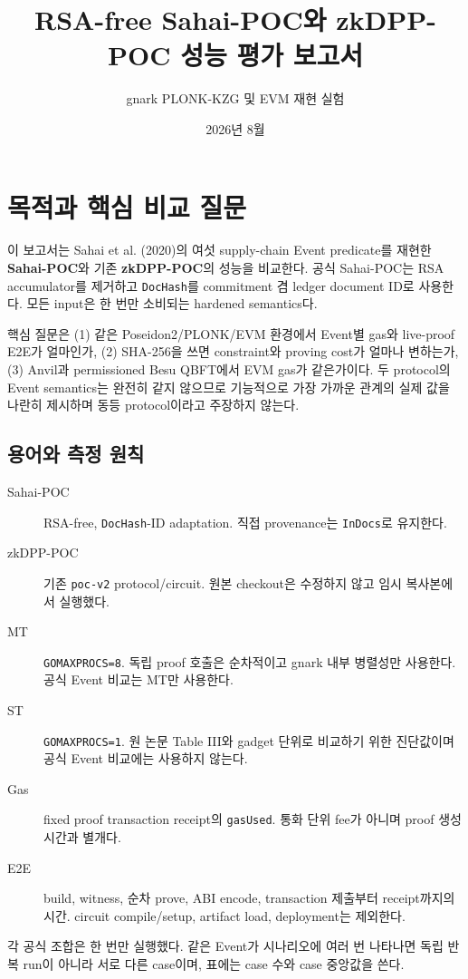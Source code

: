 \documentclass[10pt]{article}
\title{RSA-free Sahai-POC와 zkDPP-POC 성능 평가 보고서}
\author{gnark PLONK-KZG 및 EVM 재현 실험}
\date{2026년 8월}
\begin{document}
\maketitle
\tableofcontents
\newpage
\section{목적과 핵심 비교 질문}
이 보고서는 Sahai et al. (2020)의 여섯 supply-chain Event predicate를 재현한 \textbf{Sahai-POC}와 기존 \textbf{zkDPP-POC}의 성능을 비교한다. 공식 Sahai-POC는 RSA accumulator를 제거하고 \texttt{DocHash}를 commitment 겸 ledger document ID로 사용한다. 모든 input은 한 번만 소비되는 hardened semantics다.

핵심 질문은 (1) 같은 Poseidon2/PLONK/EVM 환경에서 Event별 gas와 live-proof E2E가 얼마인가, (2) SHA-256을 쓰면 constraint와 proving cost가 얼마나 변하는가, (3) Anvil과 permissioned Besu QBFT에서 EVM gas가 같은가이다. 두 protocol의 Event semantics는 완전히 같지 않으므로 기능적으로 가장 가까운 관계의 실제 값을 나란히 제시하며 동등 protocol이라고 주장하지 않는다.

\subsection{용어와 측정 원칙}
\begin{description}
\item[Sahai-POC] RSA-free, \texttt{DocHash}-ID adaptation. 직접 provenance는 \texttt{InDocs}로 유지한다.
\item[zkDPP-POC] 기존 \texttt{poc-v2} protocol/circuit. 원본 checkout은 수정하지 않고 임시 복사본에서 실행했다.
\item[MT] \texttt{GOMAXPROCS=8}. 독립 proof 호출은 순차적이고 gnark 내부 병렬성만 사용한다. 공식 Event 비교는 MT만 사용한다.
\item[ST] \texttt{GOMAXPROCS=1}. 원 논문 Table III와 gadget 단위로 비교하기 위한 진단값이며 공식 Event 비교에는 사용하지 않는다.
\item[Gas] fixed proof transaction receipt의 \texttt{gasUsed}. 통화 단위 fee가 아니며 proof 생성 시간과 별개다.
\item[E2E] build, witness, 순차 prove, ABI encode, transaction 제출부터 receipt까지의 시간. circuit compile/setup, artifact load, deployment는 제외한다.
\end{description}
각 공식 조합은 한 번만 실행했다. 같은 Event가 시나리오에 여러 번 나타나면 독립 반복 run이 아니라 서로 다른 case이며, 표에는 case 수와 case 중앙값을 쓴다.
\end{document}
